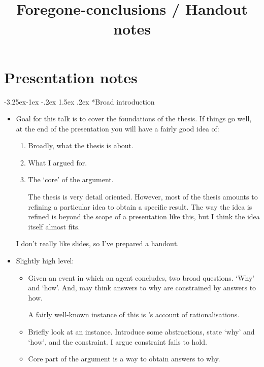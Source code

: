 \documentclass[10pt]{article}
\title{
  Foregone-conclusions \quad / \quad Handout notes
}
\date{ }
\makeatletter
\renewcommand\paragraph{\@startsection{paragraph}{4}{\z@}%
  {-3.25ex\@plus -1ex \@minus -.2ex}%
  {1.5ex \@plus .2ex}%
  {\normalfont\normalsize\bfseries}}
\makeatother
\begin{document}
\maketitle


\section*{Presentation notes}
\label{sec:presentation-notes}

\paragraph*{Broad introduction}

\begin{note}
  \begin{itemize}
  \item
    Goal for this talk is to cover the foundations of the thesis.
    If things go well, at the end of the presentation you will have a fairly good idea of:
    \begin{enumerate}
    \item
      Broadly, what the thesis is about.
    \item
      What I argued for.
    \item
      The `core' of the argument.

      The thesis is very detail oriented.
      However, most of the thesis amounts to refining a particular idea to obtain a specific result.
      The way the idea is refined is beyond the scope of a presentation like this, but I think the idea itself almost fits.
    \end{enumerate}

    I don't really like slides, so I've prepared a handout.
  \item
    Slightly high level:
    \begin{itemize}
    \item
      Given an event in which an agent concludes, two broad questions.
      `Why' and `how'.
      And, may think answers to why are constrained by answers to how.

      A fairly well-known instance of this is \citeauthor{Davidson:1963aa}'s account of rationalisations.
    \item
      Briefly look at an instance.
      Introduce some abstractions, state `why' and `how', and the constraint.
      I argue constraint fails to hold.
    \item
      Core part of the argument is a way to obtain answers to why.
    \end{itemize}
  \end{itemize}
\end{note}
\end{document}
